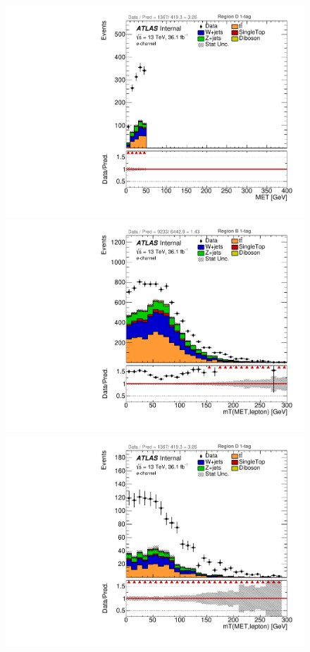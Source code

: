 \begin{figure}[!htbp]
\begin{center}
\includegraphics[scale=0.33]{./figures/boosted/ABCD_1tag0bjet/elec_Inc_RegionD_MET}    \\
\includegraphics[scale=0.33]{./figures/boosted/ABCD_1tag0bjet/elec_Inc_RegionB_WlepMtATLAS}
\includegraphics[scale=0.33]{./figures/boosted/ABCD_1tag0bjet/elec_Inc_RegionD_WlepMtATLAS}\\

\end{center}
\end{figure}
